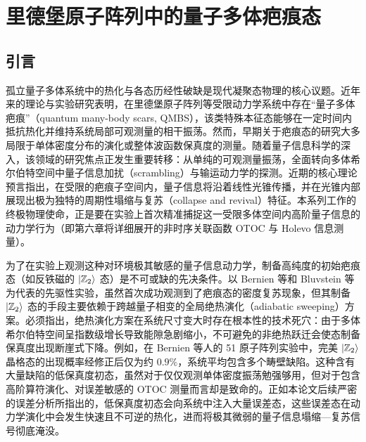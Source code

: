 \documentclass[../main.tex]{subfiles}
\begin{document}
\chapter{里德堡原子阵列中的量子多体疤痕态}
\label{ch5:sec:scar}

\section{引言}
孤立量子多体系统中的热化与各态历经性破缺是现代凝聚态物理的核心议题\cite{deutsch1991quantum,srednicki1994chaos,rigol2008thermalization,deutsch2018eigenstate,lewis2019dynamics}。近年来的理论与实验研究表明，在里德堡原子阵列等受限动力学系统中存在“量子多体疤痕”（quantum many-body scars, QMBS），该类特殊本征态能够在一定时间内抵抗热化并维持系统局部可观测量的相干振荡\cite{bernien2017probing,turner2018weak,choi2019emergent,ho2019periodic,bluvstein2021controlling,turner2021correspondence,serbyn2021quantum,desaules2024ergodicity}。然而，早期关于疤痕态的研究大多局限于单体密度分布的演化或整体波函数保真度的测量。随着量子信息科学的深入，该领域的研究焦点正发生重要转移：从单纯的可观测量振荡，全面转向多体希尔伯特空间中量子信息加扰（scrambling）与输运动力学的探测。近期的核心理论预言指出，在受限的疤痕子空间内，量子信息将沿着线性光锥传播，并在光锥内部展现出极为独特的周期性塌缩与复苏（collapse and revival）特征\cite{yuan2022quantum}。本系列工作的终极物理使命，正是要在实验上首次精准捕捉这一受限多体空间内高阶量子信息的动力学行为（即第六章将详细展开的非时序关联函数 OTOC 与 Holevo 信息测量）。

为了在实验上观测这种对环境极其敏感的量子信息动力学，制备高纯度的初始疤痕态（如反铁磁的 $\ket{\mathbb{Z}_2}$ 态）是不可或缺的先决条件。以 Bernien 等和 Bluvstein 等为代表的先驱性实验\cite{bernien2017probing,bluvstein2021controlling}，虽然首次成功观测到了疤痕态的密度复苏现象，但其制备 $\ket{\mathbb{Z}_2}$ 态的手段主要依赖于跨越量子相变的全局绝热演化（adiabatic sweeping）方案。必须指出，绝热演化方案在系统尺寸变大时存在根本性的技术死穴：由于多体希尔伯特空间呈指数级增长导致能隙急剧缩小，不可避免的非绝热跃迁会使态制备保真度出现断崖式下降\cite{bernien2017probing,omran2019generation,bluvstein2021controlling}。例如，在 Bernien 等人的 51 原子阵列实验中，完美 $\ket{\mathbb{Z}_2}$ 晶格态的出现概率经修正后仅为约 $0.9\%$，系统平均包含多个畴壁缺陷\cite{bernien2017probing}。这种含有大量缺陷的低保真度初态，虽然对于仅仅观测单体密度振荡勉强够用，但对于包含高阶算符演化、对误差敏感的 OTOC 测量而言却是致命的。正如本论文后续严密的误差分析所指出的，低保真度初态会向系统中注入大量误差态，这些误差态在动力学演化中会发生快速且不可逆的热化，进而将极其微弱的量子信息塌缩—复苏信号彻底淹没。
\end{document}

